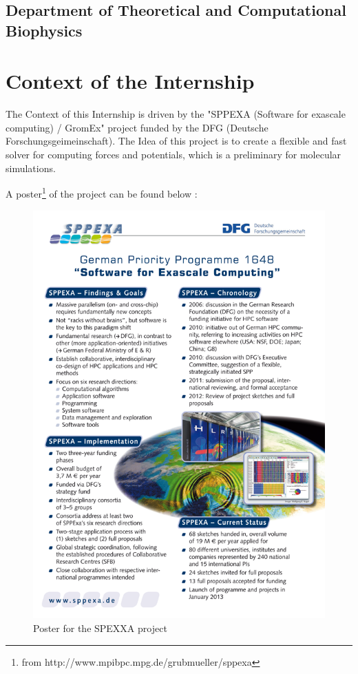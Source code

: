 \documentclass[12pt,twoside,a4paper]{report}
\begin{document}
\section*{Department of Theoretical and Computational Biophysics}


\chapter*{Context of the Internship}

The Context of this Internship is driven by the "SPPEXA (Software for exascale computing) / GromEx" project funded by the DFG (Deutsche Forschungsgeimeinschaft).
The Idea of this project is to create a flexible and fast solver for computing forces and potentials, which is a preliminary for molecular simulations.

A poster\footnote{from http://www.mpibpc.mpg.de/grubmueller/sppexa}   of the project can be found below :

\begin{figure}[H]
\includegraphics[scale=2]{sppexa-poster}
 \centering 
\caption{Poster for the SPEXXA project}
\label{fig:poster}
\end{figure}
\end{document}
